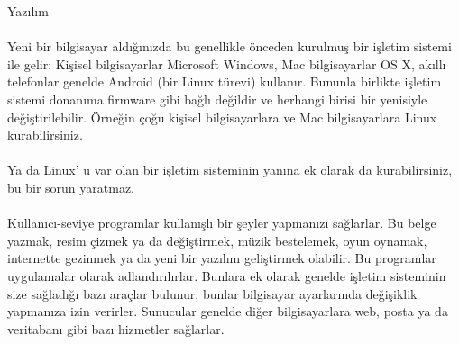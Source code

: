 \documentclass[10pt,a5paper]{book}
\begin{document}
\begin{section}{Yazılım}
\paragraph{}{Yeni bir bilgisayar aldığınızda bu genellikle önceden kurulmuş bir işletim sistemi ile gelir: Kişisel bilgisayarlar Microsoft Windows, Mac bilgisayarlar OS X, akıllı telefonlar genelde Android (bir Linux türevi) kullanır. Bununla birlikte işletim sistemi donanıma firmware gibi bağlı değildir ve herhangi birisi bir yenisiyle değiştirilebilir. Örneğin çoğu kişisel bilgisayarlara ve Mac bilgisayarlara Linux kurabilirsiniz.}
\paragraph{}{Ya da Linux' u var olan bir işletim sisteminin yanına ek olarak da kurabilirsiniz, bu bir sorun yaratmaz.}
\paragraph{}{Kullanıcı-seviye programlar kullanışlı bir şeyler yapmanızı sağlarlar. Bu belge yazmak, resim çizmek ya da değiştirmek, müzik bestelemek, oyun oynamak, internette gezinmek ya da yeni bir yazılım geliştirmek olabilir. Bu programlar uygulamalar olarak adlandırılırlar. Bunlara ek olarak genelde işletim sisteminin size sağladığı bazı araçlar bulunur, bunlar bilgisayar ayarlarında değişiklik yapmanıza izin verirler. Sunucular genelde diğer bilgisayarlara web, posta ya da veritabanı gibi bazı hizmetler sağlarlar.}
\end{section}
\end{document}
